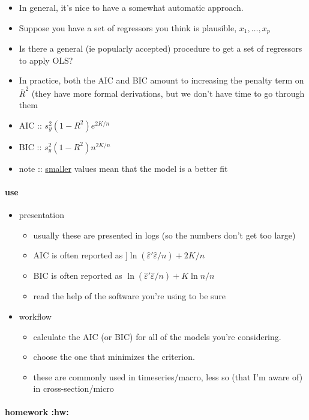\begin{itemize}
\item In general, it's nice to have a somewhat automatic approach.
\item Suppose you have a set of regressors you think is plausible,
        $x_{1},\dots,x_{p}$
\item Is there a general (ie popularly accepted) procedure to get a
        set of regressors to apply OLS?
\item In practice, both the AIC and BIC amount to increasing the
        penalty term on $\bar{R}^{2}$ (they have more formal
        derivations, but we don't have time to go through them
\item AIC :: $s_{y}^{2} (1 - R^{2}) e^{2K/n}$
\item BIC :: $s_{y}^{2} (1 - R^{2}) n^{2K/n}$
\item note :: \underline{smaller} values mean that the model is a better fit
\end{itemize}
\paragraph{use}
\label{sec-2-2-2-1}

\begin{itemize}
\item presentation
\begin{itemize}
\item usually these are presented in logs (so the numbers don't get
           too large)
\item AIC is often reported as ]$\ln(\hat{\varepsilon}'\hat{\varepsilon}/n) + 2K/n$
\item BIC is often reported as
           $\ln(\hat{\varepsilon}'\hat{\varepsilon}/n) + K\ln n/n$
\item read the help of the software you're using to be sure
\end{itemize}
\item workflow
\begin{itemize}
\item calculate the AIC (or BIC) for all of the models you're considering.
\item choose the one that minimizes the criterion.
\item these are commonly used in timeseries/macro, less so (that
           I'm aware of) in cross-section/micro
\end{itemize}
\end{itemize}
\paragraph{homework \textbf{:hw:}}
\label{sec-2-2-3}

